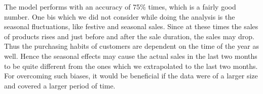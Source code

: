 The model performs with an accuracy of 75\% times, which is a fairly good number. One bis which we did not consider while doing the analysis is the seasonal fluctuations, like festive and seasonal sales. Since at these times the sales of products rises and just before and after the sale duration, the sales may drop. Thus the purchasing habits of customers are dependent on the time of the year as well. Hence the seasonal effects may cause the actual sales in the last two months to be quite different from the ones which we extrapolated to the last two months. For overcoming such biases, it would be beneficial if the data were of a larger size and covered a larger period of time.





 




















    


